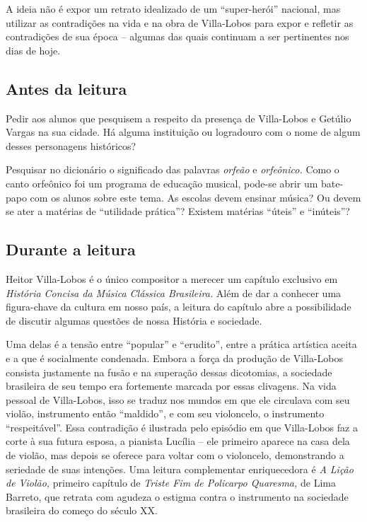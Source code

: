 \documentclass[11pt]{extarticle}
\begin{document}
A ideia não é expor um retrato idealizado de um ``super-herói''
nacional, mas utilizar as contradições na vida e na obra de Villa-Lobos
para expor e refletir as contradições de sua época -- algumas das quais
continuam a ser pertinentes nos dias de hoje.


\subsection{Antes da leitura}

Pedir aos alunos que pesquisem a respeito da presença de Villa-Lobos e
Getúlio Vargas na sua cidade. Há alguma instituição ou logradouro com o
nome de algum desses personagens históricos?

Pesquisar no dicionário o significado das palavras \emph{orfeão} e
\emph{orfeônico.} Como o canto orfeônico foi um programa de educação
musical, pode-se abrir um bate-papo com os alunos sobre este tema. As
escolas devem ensinar música? Ou devem se ater a matérias de ``utilidade
prática''? Existem matérias ``úteis'' e ``inúteis''?

\subsection{Durante a leitura}

Heitor Villa-Lobos é o único compositor a merecer um capítulo exclusivo
em \emph{História Concisa da Música Clássica Brasileira.} Além de dar a
conhecer uma figura-chave da cultura em nosso país, a leitura do
capítulo abre a possibilidade de discutir algumas questões de nossa
História e sociedade.

Uma delas é a tensão entre ``popular'' e ``erudito'', entre a prática
artística aceita e a que é socialmente condenada. Embora a força da
produção de Villa-Lobos consista justamente na fusão e na superação
dessas dicotomias, a sociedade brasileira de seu tempo era fortemente
marcada por essas clivagens. Na vida pessoal de Villa-Lobos, isso se
traduz nos mundos em que ele circulava com seu violão, instrumento então
``maldido'', e com seu violoncelo, o instrumento ``respeitável''. Essa
contradição é ilustrada pelo episódio em que Villa-Lobos faz a corte à
sua futura esposa, a pianista Lucília -- ele primeiro aparece na casa
dela de violão, mas depois se oferece para voltar com o violoncelo,
demonstrando a seriedade de suas intenções. Uma leitura complementar
enriquecedora é \emph{A Lição de Violão,} primeiro capítulo de
\emph{Triste Fim de Policarpo Quaresma,} de Lima Barreto, que retrata
com agudeza o estigma contra o instrumento na sociedade brasileira do
começo do século XX.
\end{document}
